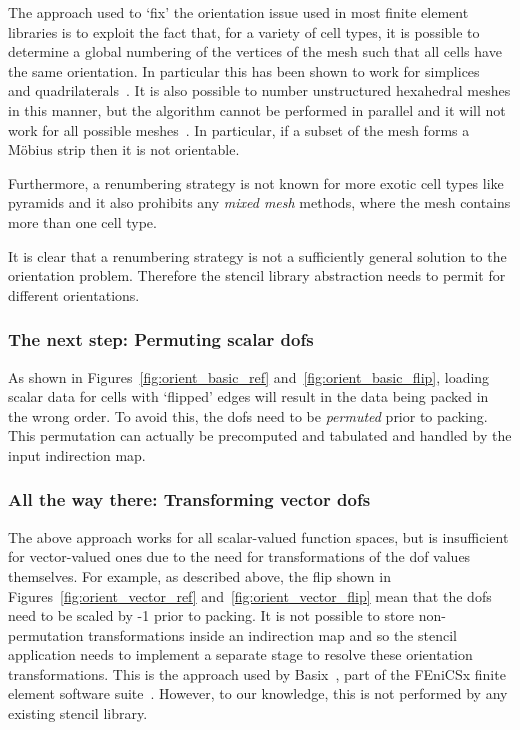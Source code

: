 The approach used to `fix' the orientation issue used in most finite element libraries is to exploit the fact that, for a variety of cell types, it is possible to determine a global numbering of the vertices of the mesh such that all cells have the same orientation.
In particular this has been shown to work for simplices~\cite{rognesEfficientAssemblyDiv2010} and quadrilaterals~\cite{agelekOrientingEdgesUnstructured2017,homolyaParallelEdgeOrientation2016}.
It is also possible to number unstructured hexahedral meshes in this manner, but the algorithm cannot be performed in parallel and it will not work for all possible meshes~\cite{agelekOrientingEdgesUnstructured2017}.
In particular, if a subset of the mesh forms a Möbius strip then it is not orientable.

Furthermore, a renumbering strategy is not known for more exotic cell types like pyramids and it also prohibits any \textit{mixed mesh} methods, where the mesh contains more than one cell type.

It is clear that a renumbering strategy is not a sufficiently general solution to the orientation problem.
Therefore the stencil library abstraction needs to permit for different orientations.

\subsubsection{The next step: Permuting scalar \glspl{dof}}

As shown in Figures~\ref{fig:orient_basic_ref} and~\ref{fig:orient_basic_flip}, loading scalar data for cells with `flipped' edges will result in the data being packed in the wrong order.
To avoid this, the \glspl{dof} need to be \textit{permuted} prior to packing.
This permutation can actually be precomputed and tabulated and handled by the input indirection map.

\subsubsection{All the way there: Transforming vector \glspl{dof}}

The above approach works for all scalar-valued function spaces, but is insufficient for vector-valued ones due to the need for transformations of the \gls{dof} values themselves.
For example, as described above, the flip shown in Figures~\ref{fig:orient_vector_ref} and~\ref{fig:orient_vector_flip} mean that the \glspl{dof} need to be scaled by -1 prior to packing.
It is not possible to store non-permutation transformations inside an indirection map and so the stencil application needs to implement a separate stage to resolve these orientation transformations.
This is the approach used by Basix~\cite{scroggsConstructionArbitraryOrder2021,scroggsBasixRuntimeFinite2022}, part of the FEniCSx finite element software suite~\cite{}.
However, to our knowledge, this is not performed by any existing stencil library.

